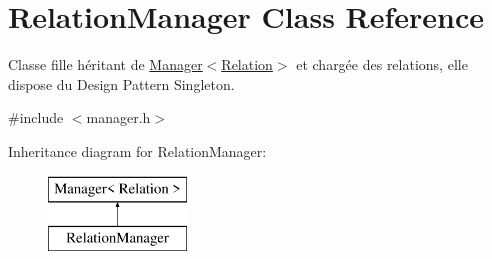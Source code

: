 \hypertarget{class_relation_manager}{}\section{Relation\+Manager Class Reference}
\label{class_relation_manager}


Classe fille héritant de \hyperlink{class_manager}{Manager$<$\+Relation$>$} et chargée des relations, elle dispose du Design Pattern Singleton.  




{\ttfamily \#include $<$manager.\+h$>$}

Inheritance diagram for Relation\+Manager\+:\begin{figure}[H]
\begin{center}
\leavevmode
\includegraphics[height=2.000000cm]{class_relation_manager}
\end{center}
\end{figure}
